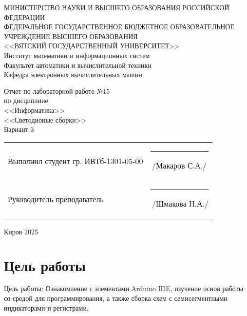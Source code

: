 \documentclass[a4paper,14pt]{extarticle}
\begin{document}
  \newpage\thispagestyle{empty}
  \begin{center}
    \MakeUppercase{
      Министерство науки и высшего образования Российской Федерации\\
      Федеральное государственное бюджетное образовательное учреждение высшего образования\\
      <<Вятский Государственный Университет>>\\
    }
    Институт математики и информационных систем\\
    Факультет автоматики и вычислительной техники\\
    Кафедра электронных вычислительных машин
  \end{center}
  \vfill

  \begin{center}
    Отчет по лабораторной работе №15\\
    по дисциплине\\
    <<Информатика>>\\
    <<Светодионые сборки>>\\
    Вариант 3
  \end{center}
  \vfill

  \noindent
  \begin{tabular}{ll}
    Выполнил студент гр. ИВТб-1301-05-00 \hspace{5mm} & \rule[-1mm]{25mm}{0.10mm}\,/Макаров С.А./ \\
    Руководитель преподаватель & \rule[-1mm]{25mm}{0.10mm}\,/Шмакова Н.А./ \\
  \end{tabular}

  \vfill
  \begin{center}
    Киров 2025
  \end{center}

  \newpage
  \section*{\hspace{12.5mm}Цель работы}
  Цель работы: Ознакомление с элементами Arduino IDE, изучение основ работы со средой для программирования, а также сборка схем с семисегментными индикаторами и регистрами.
\end{document}

